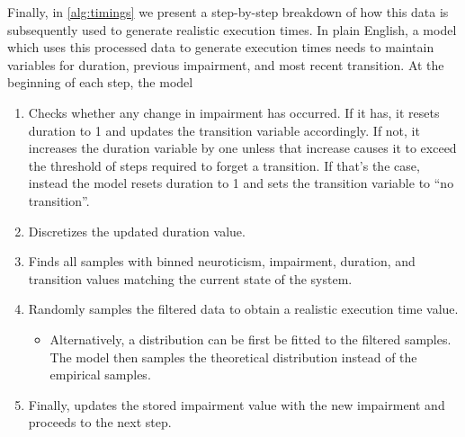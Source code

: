 Finally, in \cref{alg:timings} we present a step-by-step breakdown of how this data is subsequently used to generate realistic execution times.
In plain English, a model which uses this processed data to generate execution times needs to maintain variables for duration, previous impairment, and most recent transition.
At the beginning of each step, the model
\begin{enumerate}
    \item Checks whether any change in impairment has occurred.
          If it has, it resets duration to \num{1} and updates the transition variable accordingly.
          If not, it increases the duration variable by one unless that increase causes it to exceed the threshold of steps required to forget a transition.
          If that's the case, instead the model resets duration to \num{1} and sets the transition variable to ``no transition''.
    \item Discretizes the updated duration value.
    \item Finds all samples with binned neuroticism, impairment, duration, and transition values matching the current state of the system.
    \item Randomly samples the filtered data to obtain a realistic execution time value.
          \begin{itemize}
              \item Alternatively, a distribution can be first be fitted to the filtered samples.
                    The model then samples the theoretical distribution instead of the empirical samples.
          \end{itemize}
    \item Finally, updates the stored impairment value with the new impairment and proceeds to the next step.
\end{enumerate}

